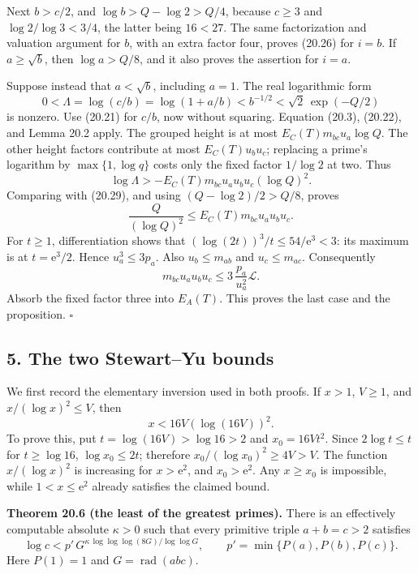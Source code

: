 \documentclass[
  11pt,
  a4paper,
]{article}
\begin{document}
Next \(b>c/2\), and \(\log b>Q-\log2>Q/4\), because \(c\ge3\) and
\(\log2/\log3<3/4\), the latter being \(16<27\). The same factorization
and valuation argument for \(b\), with an extra factor four, proves
(20.26) for \(i=b\). If \(a\ge\sqrt b\), then \(\log a>Q/8\), and it
also proves the assertion for \(i=a\).

Suppose instead that \(a<\sqrt b\), including \(a=1\). The real
logarithmic form \[
 0<\Lambda=\log(c/b)=\log(1+a/b)
       <b^{-1/2}<\sqrt2\,\exp(-Q/2)
 \tag{20.29}
\] is nonzero. Use (20.21) for \(c/b\), now without squaring. Equation
(20.3), (20.22), and Lemma 20.2 apply. The grouped height is at most
\(E_C(T)m_{bc}u_a\log Q\). The other height factors contribute at most
\(E_C(T)u_bu_c\); replacing a prime's logarithm by \(\max\{1,\log q\}\)
costs only the fixed factor \(1/\log2\) at two. Thus \[
 \log\Lambda>
 -E_C(T)m_{bc}u_au_bu_c(\log Q)^2.
 \tag{20.30}
\] Comparing with (20.29), and using \((Q-\log2)/2>Q/8\), proves \[
 \frac Q{(\log Q)^2}\le E_C(T)m_{bc}u_au_bu_c.
 \tag{20.31}
\] For \(t\ge1\), differentiation shows that
\((\log(2t))^3/t\le54/\mathrm e^3<3\): its maximum is at
\(t=\mathrm e^3/2\). Hence \(u_a^3\le3p_a\). Also \(u_b\le m_{ab}\) and
\(u_c\le m_{ac}\). Consequently \[
 m_{bc}u_au_bu_c
 \le3\,\frac{p_a}{u_a^2}\mathcal L.
 \] Absorb the fixed factor three into \(E_A(T)\). This proves the last
case and the proposition. \(\square\)

\subsection{5. The two Stewart--Yu
bounds}\label{the-two-stewartyu-bounds}

We first record the elementary inversion used in both proofs. If
\(x>1\), \(V\ge1\), and \(x/(\log x)^2\le V\), then \[
 x<16V(\log(16V))^2.
 \tag{20.32}
\] To prove this, put \(t=\log(16V)>\log16>2\) and \(x_0=16Vt^2\). Since
\(2\log t\le t\) for \(t\ge\log16\), \(\log x_0\le2t\); therefore
\(x_0/(\log x_0)^2\ge4V>V\). The function \(x/(\log x)^2\) is increasing
for \(x>\mathrm e^2\), and \(x_0>\mathrm e^2\). Any \(x\ge x_0\) is
impossible, while \(1<x\le\mathrm e^2\) already satisfies the claimed
bound.

\textbf{Theorem 20.6 (the least of the greatest primes).} There is an
effectively computable absolute \(\kappa>0\) such that every primitive
triple \(a+b=c>2\) satisfies \[
 \log c<
 p'\,G^{\kappa\,\log\log\log(8G)/\log\log G},
 \qquad p'=\min\{P(a),P(b),P(c)\}.
 \tag{20.33}
\] Here \(P(1)=1\) and \(G=\operatorname{rad}(abc)\).
\end{document}
